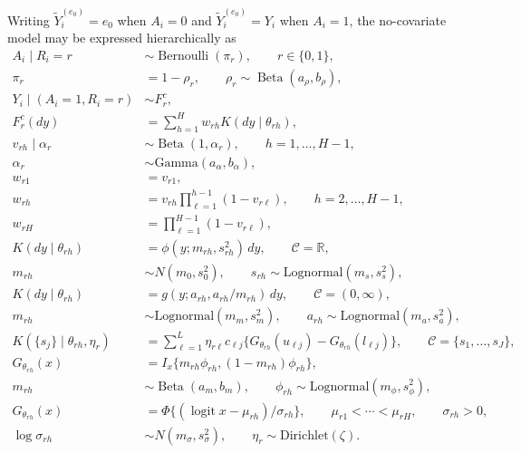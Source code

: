 \documentclass[11pt]{article}
\DeclareMathOperator*{\Bernoulli}{Bernoulli}
\DeclareMathOperator*{\Beta}{Beta}
\begin{document}
Writing $\widetilde{Y}_i^{(e_0)} = e_0$ when $A_i = 0$ and $\widetilde{Y}_i^{(e_0)} = Y_i$ when $A_i = 1$, the no-covariate model may be expressed hierarchically as
\begin{align}
  A_i \mid R_i = r
  &\sim \Bernoulli(\pi_r),
  \qquad
  r \in \{0,1\},
  \nonumber\\
  \pi_r
  &= 1 - \rho_r,
  \qquad
  \rho_r \sim \Beta(a_{\rho}, b_{\rho}),
  \nonumber\\
  Y_i \mid (A_i = 1, R_i = r)
  &\sim F_r^c,
  \nonumber\\
  F_r^c(dy)
  &= \sum_{h=1}^{H} w_{rh}K(dy \mid \theta_{rh}),
  \nonumber\\
  v_{rh} \mid \alpha_r
  &\sim \Beta(1,\alpha_r),
  \qquad
  h = 1,\ldots,H-1,
  \nonumber\\
  \alpha_r
  &\sim \mathrm{Gamma}(a_{\alpha}, b_{\alpha}),
  \nonumber\\
  w_{r1}
  &= v_{r1},
  \nonumber\\
  w_{rh}
  &= v_{rh}\prod_{\ell=1}^{h-1}(1-v_{r\ell}),
  \qquad
  h = 2,\ldots,H-1,
  \nonumber\\
  w_{rH}
  &= \prod_{\ell=1}^{H-1}(1-v_{r\ell}),
  \label{eq:bayes-hierarchy}\\
  K(dy \mid \theta_{rh})
  &= \phi(y; m_{rh}, s_{rh}^2)\,dy,
  \qquad
  \mathcal{C} = \mathbb{R},
  \nonumber\\
  m_{rh}
  &\sim N(m_0,s_0^2),
  \qquad
  s_{rh} \sim \mathrm{Lognormal}(m_s,s_s^2),
  \nonumber\\
  K(dy \mid \theta_{rh})
  &= g\!\left(y; a_{rh}, a_{rh}/m_{rh}\right)\,dy,
  \qquad
  \mathcal{C} = (0,\infty),
  \nonumber\\
  m_{rh}
  &\sim \mathrm{Lognormal}(m_m,s_m^2),
  \qquad
  a_{rh} \sim \mathrm{Lognormal}(m_a,s_a^2),
  \nonumber\\
  K(\{s_j\}\mid \theta_{rh},\eta_r)
  &=
  \sum_{\ell=1}^{L}\eta_{r\ell}
  c_{\ell j}\{G_{\theta_{rh}}(u_{\ell j})-G_{\theta_{rh}}(l_{\ell j})\},
  \qquad
  \mathcal{C}=\{s_1,\ldots,s_J\},
  \nonumber\\
  G_{\theta_{rh}}(x)
  &=
  I_x\{m_{rh}\phi_{rh},(1-m_{rh})\phi_{rh}\},
  \nonumber\\
  m_{rh}
  &\sim \Beta(a_m,b_m),
  \qquad
  \phi_{rh}\sim \mathrm{Lognormal}(m_\phi,s_\phi^2),
  \nonumber\\
  G_{\theta_{rh}}(x)
  &=
  \Phi\{(\operatorname{logit}x-\mu_{rh})/\sigma_{rh}\},
  \qquad
  \mu_{r1}<\cdots<\mu_{rH},
  \qquad
  \sigma_{rh}>0,
  \nonumber\\
  \log\sigma_{rh}
  &\sim N(m_\sigma,s_\sigma^2),
  \qquad
  \eta_r \sim \mathrm{Dirichlet}(\zeta).
  \nonumber
\end{align}
\end{document}
